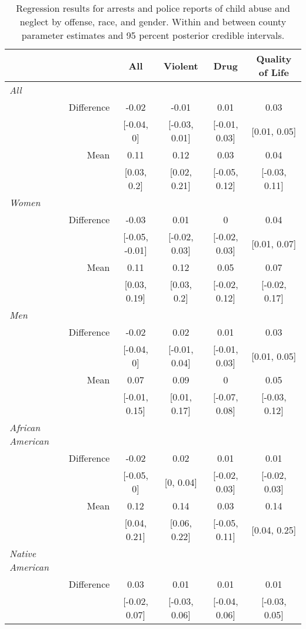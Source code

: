 \begin{table}[ht]
\centering
\caption{Regression results for arrests and police reports of child abuse and neglect by offense, race, and gender. Within and between county parameter estimates and 95 percent posterior credible intervals.} 
\begin{tabular}{lrcccc}
  \hline
  &   & All & Violent & Drug & Quality of Life \\ 
  \hline
{\textit{All}} &  &  &  &  &  \\ 
   & Difference & -0.02 & -0.01 & 0.01 & 0.03 \\ 
   &  & [-0.04, 0] & [-0.03, 0.01] & [-0.01, 0.03] & [0.01, 0.05] \\ 
   & Mean & 0.11 & 0.12 & 0.03 & 0.04 \\ 
   &  & [0.03, 0.2] & [0.02, 0.21] & [-0.05, 0.12] & [-0.03, 0.11] \\ 
  {\textit{Women}} &  &  &  &  &  \\ 
   & Difference & -0.03 & 0.01 & 0 & 0.04 \\ 
   &  & [-0.05, -0.01] & [-0.02, 0.03] & [-0.02, 0.03] & [0.01, 0.07] \\ 
   & Mean & 0.11 & 0.12 & 0.05 & 0.07 \\ 
   &  & [0.03, 0.19] & [0.03, 0.2] & [-0.02, 0.12] & [-0.02, 0.17] \\ 
  {\textit{Men}} &  &  &  &  &  \\ 
   & Difference & -0.02 & 0.02 & 0.01 & 0.03 \\ 
   &  & [-0.04, 0] & [-0.01, 0.04] & [-0.01, 0.03] & [0.01, 0.05] \\ 
   & Mean & 0.07 & 0.09 & 0 & 0.05 \\ 
   &  & [-0.01, 0.15] & [0.01, 0.17] & [-0.07, 0.08] & [-0.03, 0.12] \\ 
  {\textit{African American}} &  &  &  &  &  \\ 
   & Difference & -0.02 & 0.02 & 0.01 & 0.01 \\ 
   &  & [-0.05, 0] & [0, 0.04] & [-0.02, 0.03] & [-0.02, 0.03] \\ 
   & Mean & 0.12 & 0.14 & 0.03 & 0.14 \\ 
   &  & [0.04, 0.21] & [0.06, 0.22] & [-0.05, 0.11] & [0.04, 0.25] \\ 
  {\textit{Native American}} &  &  &  &  &  \\ 
   & Difference & 0.03 & 0.01 & 0.01 & 0.01 \\ 
   &  & [-0.02, 0.07] & [-0.03, 0.06] & [-0.04, 0.06] & [-0.03, 0.05] \\ 

\end{tabular}
\end{table}
